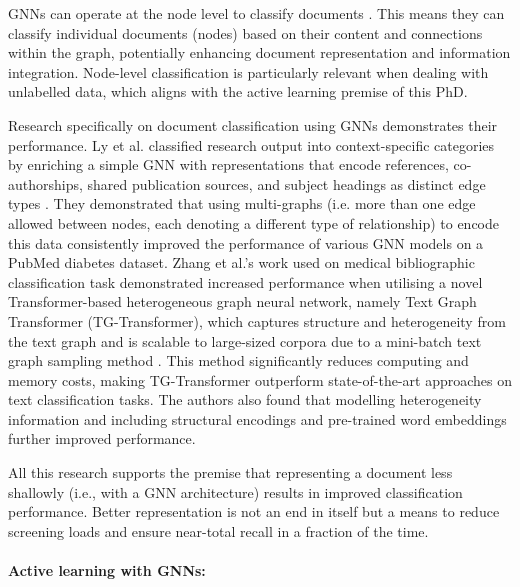 \documentclass[10pt,oneside]{book}
\begin{document}
GNNs can operate at the node level to classify  documents \cite{kipf_semi-supervised_2017, yao_graph_2018, wang_graph_2024, rong_dropedge_2020}. This means they can classify individual documents (nodes) based on their content and connections within the graph, potentially enhancing document representation and information integration. Node-level classification is particularly relevant when dealing with unlabelled data, which aligns with the active learning premise of this PhD.

Research specifically on document classification using GNNs demonstrates their performance. Ly et al. classified research output into context-specific categories by enriching a simple GNN with representations that encode references, co-authorships, shared publication sources, and subject headings as distinct edge types \cite{ly_article_2024}. They demonstrated that using multi-graphs (i.e. more than one edge allowed between nodes, each denoting a different type of relationship) to encode this data consistently improved the performance of various GNN models on a PubMed diabetes dataset. Zhang et al.'s work used on medical bibliographic classification task demonstrated increased performance when utilising a novel Transformer-based heterogeneous graph neural network, namely Text Graph Transformer (TG-Transformer), which captures structure and heterogeneity from the text graph and is scalable to large-sized corpora due to a mini-batch text graph sampling method \cite{zhang_evaluating_2020}. This method significantly reduces computing and memory costs, making TG-Transformer outperform state-of-the-art approaches on text classification tasks. The authors also found that modelling heterogeneity information and including structural encodings and pre-trained word embeddings further improved performance.

All this research supports the premise that representing a document less shallowly (i.e., with a GNN architecture) results in improved classification performance. Better representation is not an end in itself but a means to reduce screening loads and ensure near-total recall in a fraction of the time.

\paragraph{Active learning with GNNs: }
\end{document}
